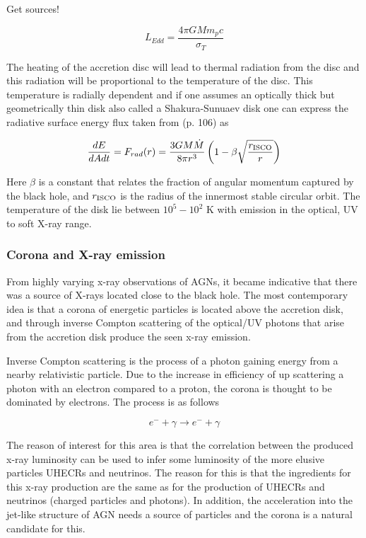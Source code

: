 \documentclass{article}
\begin{document}
Get sources!

\begin{equation}
    L_{Edd} = \frac{4\pi G M m_p c}{\sigma_T}
    \label{eq:eddington_luminosity}
\end{equation}

The heating of the accretion disc will lead to thermal radiation from the disc and this radiation will be
proportional to the temperature of the disc. This temperature is radially dependent and if one assumes an optically thick but geometrically thin disk also called a Shakura-Sunuaev disk
one can express the radiative surface energy flux taken from \cite{BHradiation}(p. 106) as 

\begin{equation}
    \frac{dE}{dAdt}= F_{rad}(r) = \frac{3GM\dot{M}}{8\pi r^3}\left(1-\beta\sqrt{\frac{r_{\rm ISCO}}{r}}\right)
\end{equation}

Here $\beta$ is a constant that relates the fraction of angular momentum captured by the black hole, and $r_{\rm ISCO}$ is the radius of the innermost stable circular orbit. 
The temperature of the disk lie between $10^5 - 10^2$ K with emission in the optical, UV to soft X-ray range. \cite{scholarpedia_accretion_discs}


\subsubsection{Corona and X-ray emission}
From highly varying x-ray observations of AGNs, it became indicative that there was a source of X-rays located close to the black hole. 
The most contemporary idea is that a corona of energetic particles is located above the accretion disk, and through inverse Compton scattering
of the optical/UV photons that arise from the accretion disk produce the seen x-ray emission. 

Inverse Compton scattering is the process of a photon gaining energy from a nearby relativistic particle. Due to the increase in efficiency 
of up scattering a photon with an electron compared to a proton, the corona is thought to be dominated by electrons. The process is as follows

\begin{equation}
    e^- + \gamma \rightarrow e^- + \gamma 
\end{equation}

The reason of interest for this area is that the correlation between the produced x-ray luminosity can be used to infer some luminosity of the more elusive 
particles UHECRs and neutrinos. The reason for this is that the ingredients for this x-ray production are the same as for the production of UHECRs and neutrinos (charged particles and photons). In addition, 
the acceleration into the jet-like structure of AGN needs a source of particles and the corona is a natural candidate for this.
\end{document}
